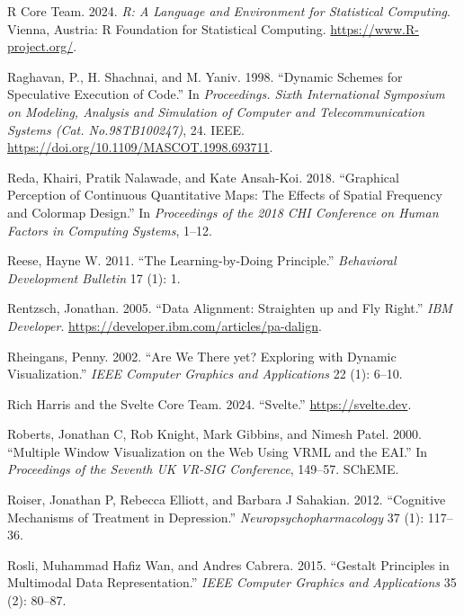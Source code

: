 \documentclass[
  openany]{book}
\newlength{\cslhangindent}
\newenvironment{CSLReferences}[2] %
 {\begin{list}{}{%
  \setlength{\itemindent}{0pt}
  \setlength{\leftmargin}{0pt}
  \setlength{\parsep}{0pt}
  \ifodd #1
   \setlength{\leftmargin}{\cslhangindent}
   \setlength{\itemindent}{-1\cslhangindent}
  \fi
  \setlength{\itemsep}{#2\baselineskip}}}
 {\end{list}}
\theoremstyle{definition}
\theoremstyle{definition}
\theoremstyle{definition}
\theoremstyle{definition}
\theoremstyle{remark}
\begin{document}
\begin{CSLReferences}{1}{0}
R Core Team. 2024. \emph{R: A Language and Environment for Statistical Computing}. Vienna, Austria: R Foundation for Statistical Computing. \url{https://www.R-project.org/}.

Raghavan, P., H. Shachnai, and M. Yaniv. 1998. {``Dynamic Schemes for Speculative Execution of Code.''} In \emph{Proceedings. Sixth International Symposium on Modeling, Analysis and Simulation of Computer and Telecommunication Systems (Cat. No.98TB100247)}, 24. IEEE. \url{https://doi.org/10.1109/MASCOT.1998.693711}.

Reda, Khairi, Pratik Nalawade, and Kate Ansah-Koi. 2018. {``Graphical Perception of Continuous Quantitative Maps: The Effects of Spatial Frequency and Colormap Design.''} In \emph{Proceedings of the 2018 CHI Conference on Human Factors in Computing Systems}, 1--12.

Reese, Hayne W. 2011. {``The Learning-by-Doing Principle.''} \emph{Behavioral Development Bulletin} 17 (1): 1.

Rentzsch, Jonathan. 2005. {``Data Alignment: Straighten up and Fly Right.''} \emph{IBM Developer}. \url{https://developer.ibm.com/articles/pa-dalign}.

Rheingans, Penny. 2002. {``Are We There yet? Exploring with Dynamic Visualization.''} \emph{IEEE Computer Graphics and Applications} 22 (1): 6--10.

Rich Harris and the Svelte Core Team. 2024. {``Svelte.''} \url{https://svelte.dev}.

Roberts, Jonathan C, Rob Knight, Mark Gibbins, and Nimesh Patel. 2000. {``Multiple Window Visualization on the Web Using VRML and the EAI.''} In \emph{Proceedings of the Seventh UK VR-SIG Conference}, 149--57. SChEME.

Roiser, Jonathan P, Rebecca Elliott, and Barbara J Sahakian. 2012. {``Cognitive Mechanisms of Treatment in Depression.''} \emph{Neuropsychopharmacology} 37 (1): 117--36.

Rosli, Muhammad Hafiz Wan, and Andres Cabrera. 2015. {``Gestalt Principles in Multimodal Data Representation.''} \emph{IEEE Computer Graphics and Applications} 35 (2): 80--87.


\end{CSLReferences}
\end{document}
